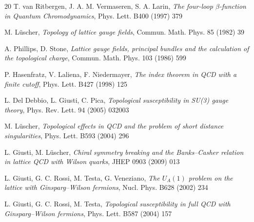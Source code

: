 \begin{thebibliography}{20}
T. van Ritbergen, J. A. M. Vermaseren, S. A. Larin,
\textit{The four-loop $\beta$-function in Quantum Chromodynamics},
Phys. Lett. B400 (1997) 379

M. L\"uscher,
\textit{Topology of lattice gauge fields},
Commun. Math. Phys. 85 (1982) 39

A. Phillips, D. Stone, \textit{Lattice gauge fields,
principal bundles and the calculation of the topological charge},
Commun. Math. Phys. 103 (1986) 599

P. Hasenfratz, V. Laliena, F. Niedermayer,
\textit{The index theorem in QCD with a finite cutoff},
Phys. Lett. B427 (1998) 125

L. Del Debbio, L. Giusti, C. Pica,
\textit{Topological susceptibility in SU(3) gauge theory},
Phys. Rev. Lett. 94 (2005) 032003

M. L\"uscher,
\textit{Topological effects in QCD and the
problem of short distance singularities},
Phys. Lett. B593 (2004) 296

L. Giusti, M. L\"uscher,
\textit{Chiral symmetry breaking and the Banks--Casher relation
in lattice QCD with Wilson quarks},
JHEP 0903 (2009) 013

L. Giusti, G. C. Rossi, M. Testa, G. Veneziano,
\textit{The $U_A(1)$ problem on the lattice with Ginsparg--Wilson fermions},
Nucl. Phys. B628 (2002) 234

L. Giusti, G. C. Rossi, M. Testa,
\textit{Topological susceptibility in full QCD with Ginsparg--Wilson fermions},
Phys. Lett. B587 (2004) 157

\end{thebibliography}




